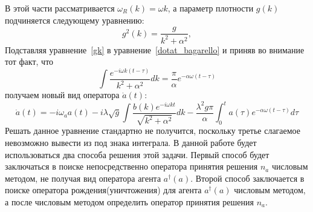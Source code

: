 В этой части рассматривается $\omega_{R}(k) = \omega k$, а параметр плотности $g(k)$ подчиняется
следующему уравнению:
\begin{equation}\label{gk}
    g^{2}(k) = \frac{g}{k^{2} + \alpha^{2}},
\end{equation}
Подставляя уравнение~\eqref{gk} в уравнение~\eqref{dotat_bagarello} и приняв во внимание тот факт, что
\begin{equation}
    \int \frac{e^{-i \omega k (t - \tau)}}{k^{2} + \alpha^{2}} dk = \frac{\pi}{\alpha} e^{-\alpha \omega (t - \tau)}
\end{equation}
получаем новый вид оператора $\dot{a}(t)$:
\begin{equation}\label{dotat}
    \dot{a}(t) =
    -i \omega_{a} a(t)
    -i \lambda \sqrt{g} \int \frac{b(k)e^{-i \omega k t}}{\sqrt{k^{2} + \alpha^2}} dk
    -\frac{\lambda^{2} g \pi}{\alpha} \int_{0}^{t} a(\tau) e^{- \alpha \omega (t - \tau)} d\tau
\end{equation}
Решать данное уравнение стандартно не получится, поскольку третье слагаемое невозможно вывести из
под знака интеграла.
В данной работе будет использоваться два способа решения этой задачи.
Первый способ будет заключаться в поиске непосредственно оператора принятия решения $n_{a}$ числовым
методом, не получая вид оператора агента $a^{\dagger}(a)$.
Второй способ заключается в поиске оператора рождения(уничтожения) для агента $a^{\dagger}(a)$ числовым
методом, а после числовым методом определить оператор принятия решения $n_{a}$.

